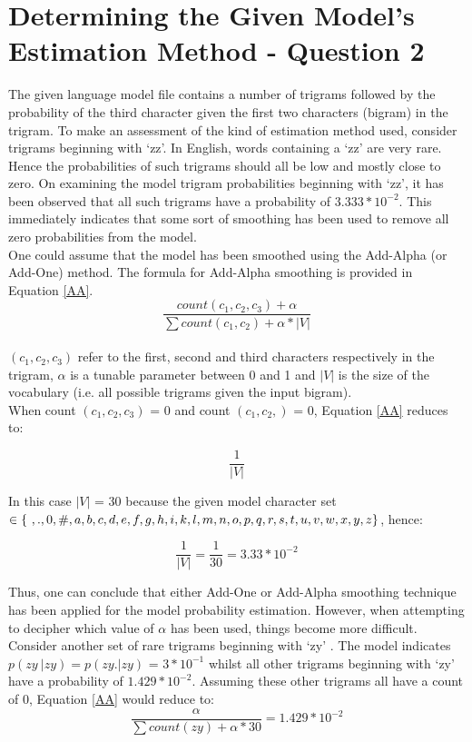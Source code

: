 \documentclass[12pt]{article}
\begin{document}
\section{Determining the Given Model's Estimation Method - Question 2} 
The given language model file contains a number of trigrams followed by the probability of the third character given the first two characters (bigram) in the trigram. To make an assessment of the kind of estimation method used, consider trigrams beginning with `zz'. In English, words containing a `zz' are very rare. Hence the probabilities of such trigrams should all be low and mostly close to zero. On examining the model trigram probabilities beginning with `zz', it has been observed that all such trigrams have a probability of  
$3.333 * 10^{-2}$.  This immediately indicates that some sort of smoothing has been used to remove all zero probabilities from the model.\\
\hfill\break
One could assume that the model has been smoothed using the Add-Alpha (or Add-One) method. The formula for Add-Alpha smoothing is provided in Equation \ref{AA}.
\begin{equation}\label{AA}
 \dfrac{{count(c_{1},c_{2},c_{3})} + \alpha} {\sum count(c_1,c_2)+ \alpha * |V|} 
\end{equation}\\  
$(c_1,c_2,c_3)$ refer to the first, second and third characters respectively in the trigram, $\alpha$ is a tunable parameter between 0 and 1 and $|V|$ is the size of the vocabulary (i.e. all possible trigrams given the input bigram).\\
\hfill\break
When count $(c_1,c_2,c_3)$ = 0 and count $(c_1,c_2,)$ = 0, Equation \ref{AA} reduces to:

\[\dfrac{1} {|V|} \]

In this case $|V|$ = 30 because the given model character set $ \in \{  \  ,.,0,\#,a,b,c,d,e,f,g,h,i,\\k,l,m,n,o,p,q,r,s,t,u,v,w,x,y,z\}$, hence:

\[\dfrac{1} {|V|}  = \dfrac{1} {30} = 3.33 * 10^{-2}\]

Thus, one can conclude that either Add-One or Add-Alpha smoothing technique has been applied for the model probability estimation. However, when attempting to decipher which value of $\alpha$ has been used, things become more difficult.\\
\hfill\break
Consider another set of rare trigrams beginning with `zy' . The model indicates $p(zy\ | zy) = p(zy. | zy)$ = $3 * 10^{-1}$ whilst all other trigrams beginning with `zy' have a probability of $1.429 * 10^{-2}$. Assuming these other trigrams all have a count of 0, Equation \ref{AA}  would reduce to:
\[\dfrac{ \alpha} {\sum count(zy)+ \alpha * 30} = 1.429 * 10^{-2}\]
\end{document}
